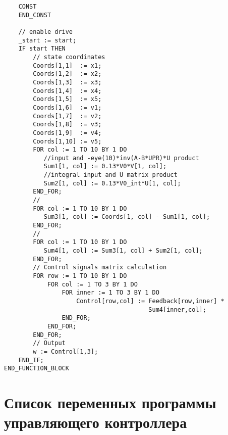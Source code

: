 \begin{verbatim}
    CONST
    END_CONST
    
    // enable drive
    _start := start;
    IF start THEN
        // state coordinates
        Coords[1,1]  := x1;
        Coords[1,2]  := x2;
        Coords[1,3]  := x3;
        Coords[1,4]  := x4;
        Coords[1,5]  := x5;
        Coords[1,6]  := v1;
        Coords[1,7]  := v2;
        Coords[1,8]  := v3;
        Coords[1,9]  := v4;
        Coords[1,10] := v5;
        FOR col := 1 TO 10 BY 1 DO
           //input and -eye(10)*inv(A-B*UPR)*U product
           Sum1[1, col] := 0.13*V0*V[1, col];
           //integral input and U matrix product
           Sum2[1, col] := 0.13*V0_int*U[1, col];            
        END_FOR;
        // 
        FOR col := 1 TO 10 BY 1 DO
           Sum3[1, col] := Coords[1, col] - Sum1[1, col];
        END_FOR;
        //
        FOR col := 1 TO 10 BY 1 DO
           Sum4[1, col] := Sum3[1, col] + Sum2[1, col];
        END_FOR;
        // Control signals matrix calculation
        FOR row := 1 TO 10 BY 1 DO
            FOR col := 1 TO 3 BY 1 DO
                FOR inner := 1 TO 3 BY 1 DO
                    Control[row,col] := Feedback[row,inner] *
                                        Sum4[inner,col];
                END_FOR;
            END_FOR;
        END_FOR;
        // Output
        w := Control[1,3];    
    END_IF;
END_FUNCTION_BLOCK
\end{verbatim}

\section{Список переменных программы управляющего контроллера} \label{AppendixB7}

